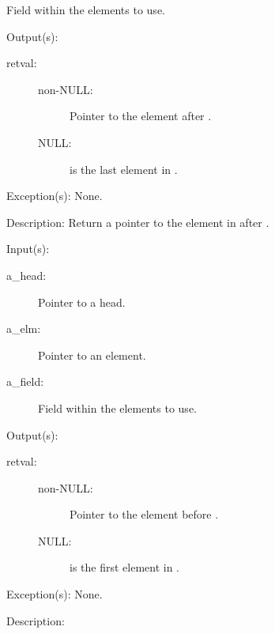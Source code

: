 \begin{capi}
\begin{capilist}
\begin{description}
			Field within the  elements to use.
		\end{description}
	\item[Output(s): ]
		\begin{description}\item[]
		\item[retval: ]
			\begin{description}\item[]
			\item[non-NULL: ]
				Pointer to the element after .
			\item[NULL: ]
				 is the last element in
				.
			\end{description}
		\end{description}
	\item[Exception(s): ] None.
	\item[Description: ]
		Return a pointer to the element in  after
		.
	\end{capilist}
\label{ql_prev}
	\begin{capilist}
	\item[Input(s): ]
		\begin{description}\item[]
		\item[a\_head: ]
			Pointer to a  head.
		\item[a\_elm: ]
			Pointer to an element.
		\item[a\_field: ]
			Field within the  elements to use.
		\end{description}
	\item[Output(s): ]
		\begin{description}\item[]
		\item[retval: ]
			\begin{description}\item[]
			\item[non-NULL: ]
				Pointer to the element before .
			\item[NULL: ]
				 is the first element in
				.
			\end{description}
		\end{description}
	\item[Exception(s): ] None.
	\item[Description: ]

\end{capilist}
\end{capi}
